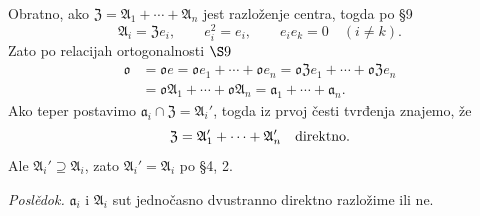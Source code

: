 \documentclass[11pt]{article}
\providecommand{\ma}{\mathfrak{a}}
\providecommand{\mA}{\mathfrak{A}}
\providecommand{\mZ}{\mathfrak{Z}}
\providecommand{\mo}{\mathfrak{o}}
\begin{document}
Obratno, ako $\mZ=\mA_1+\cdots+\mA_n$ jest razloženje centra, togda po §9
\[
        \mA_i=\mZ e_i,
        \qquad e_i^2=e_i,
        \qquad e_i e_k=0\quad(i\ne k).
\]
Zato po relacijah ortogonalnosti \hbox{\(\S 9\)}
\[
\begin{aligned}
        \mo&=\mo e=\mo e_1+\cdots+\mo e_n
        =\mo\mZ e_1+\cdots+\mo\mZ e_n\\
        &=\mo\mA_1+\cdots+\mo\mA_n
        =\ma_1+\cdots+\ma_n .
\end{aligned}
\]
Ako teper postavimo $\ma_i\cap\mZ=\mA_i'$, togda iz prvoj česti tvrđenja znajemo, že
\[
        \mZ=\mA_1'+\cdots+\mA_n'\quad\hbox{direktno}.
\]
Ale $\mA_i'\supseteq\mA_i$, zato $\mA_i'=\mA_i$ po §4, 2.

\emph{Poslědok.} $\ma_i$ i $\mA_i$ sut jednočasno dvustranno direktno razložime ili ne.
\end{document}
